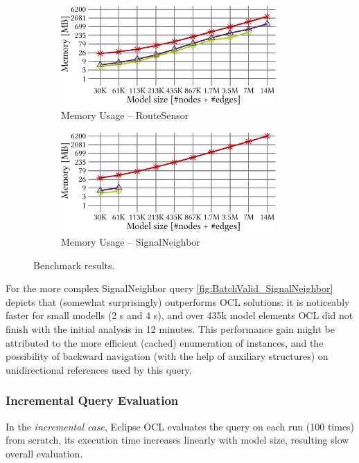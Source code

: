 \begin{figure}[ht]
\begin{center}
	\begin{subfigure}[t]{0.48\textwidth}\centering
	    \includegraphics[width=0.9\textwidth]{figures/trainBenchmark_User_Memory_RouteSensor}
	    \caption{Memory Usage -- RouteSensor}
	    \label{fig:Memory_RouteSensor}
	\end{subfigure}
	\begin{subfigure}[t]{0.48\textwidth}\centering
	    \includegraphics[width=0.9\textwidth]{figures/trainBenchmark_User_Memory_SignalNeighbor}
	    \caption{Memory Usage -- SignalNeighbor}
	    \label{fig:Memory_SignalNeighbor}
	\end{subfigure}
  \caption{Benchmark results.}
  \label{fig:trainbenchmark-diagrams}
\end{center}
\end{figure}

For the more complex \textsf{SignalNeighbor} query
\autoref{fig:BatchValid_SignalNeighbor} depicts that \incquery{} (somewhat
surprisingly) outperforms OCL solutions: it is noticeably faster for small
modells (2 s and 4 s), and over 435k model elements OCL did not finish with
the initial analysis in 12 minutes. This performance gain might be attributed to
the more efficient (cached) enumeration of instances, and the possibility of
backward navigation (with the help of auxiliary structures) on unidirectional
references used by this query.

\subsubsection{Incremental Query Evaluation}
In the \emph{incremental case}, Eclipse OCL evaluates the query on each run
(100 times) from scratch, its execution time increases linearly with
model size, resulting slow overall evaluation.

